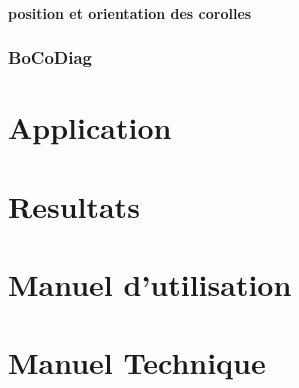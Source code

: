 \documentclass{article}
\begin{document}
	\paragraph{position et orientation des corolles}

	\subsubsection{BoCoDiag}

	\section{Application}

	\section{Resultats}

	\section{Manuel d'utilisation}

	\section{Manuel Technique}


	
	
\end{document}
